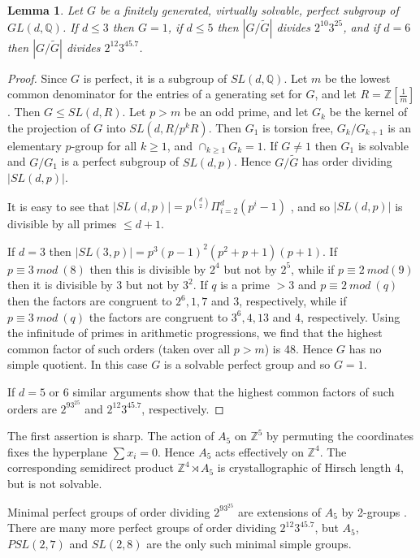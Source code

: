 \documentclass[12pt]{amsart}
\renewcommand{\geq}{\geqslant}
\renewcommand{\leq}{\leqslant}
\newtheorem{lemma}[theorem]{Lemma}
\begin{document}
\begin{lemma}
\label{sl2}
Let $G$ be a finitely generated, virtually solvable,  
perfect subgroup of $GL(d,\mathbb{Q})$. 
If $d\leq3$ then $G=1$,  if $d\leq5$ then $|G/\widetilde{G}|$ divides
$2^{10}3^25$, and if $d=6$ then $|G/\widetilde{G}|$ divides $2^{12}3^45.7$.
\end{lemma}

\begin{proof}
Since $G$ is perfect, it is a subgroup of $SL(d,\mathbb{Q})$.
Let $m$ be the lowest common denominator for 
the entries of a generating set for $G$,
and let $R=\mathbb{Z}[\frac1m]$.
Then $G\leq{SL(d,R)}$.
Let $p>m$ be an odd prime,
and let $G_k$ be the kernel of the projection of $G$ into $SL(d,R/p^kR)$.
Then $G_1$ is torsion free,
$G_k/G_{k+1}$ is an elementary $p$-group for all $k\geq1$,
and $\cap_{k\geq1}G_k=1$.
If $G\not=1$ then $G_1$ is solvable and $G/G_1$ is a perfect subgroup of $SL(d,p)$.
Hence $G/\widetilde{G}$ has order dividing $|SL(d,p)|$.

It is easy to see that $|SL(d,p)|=p^{\binom{d}2}\Pi_{i=2}^d(p^i-1)$
 \cite[3.2.7]{Ro}, 
and so $|SL(d,p)|$ is divisible by all primes $\leq{d+1}$.

If $d=3$ then $|SL(3,p)|=p^3(p-1)^2(p^2+p+1)(p+1)$.
If $p\equiv3~mod~(8)$ then this is divisible by $2^4$ but not by $2^5$,
while if $p\equiv2~mod(9)$ then it is divisible by 3 but not by $3^2$.
If $q$ is a prime $>3$ and $p\equiv2~mod~(q)$ then the factors are congruent 
to $2^6,1,7$ and 3, respectively,  while if $p\equiv3~mod~(q)$ 
the factors are congruent to $3^6,4,13$ and 4, respectively.
Using the infinitude of primes in arithmetic progressions,
we find that the highest common factor of such orders (taken over all $p>m$) is 48.
Hence $G$ has no simple quotient.
In this case $G$ is a solvable perfect group and so $G=1$.

If $d=5$ or 6 similar arguments show that the highest common factors 
of such orders are $2^93^25$ and $2^{12}3^45.7$,
respectively.
\end{proof}

The first assertion is sharp.
The action of $A_5$ on $\mathbb{Z}^5$ by permuting the coordinates fixes
the hyperplane $\sum{x_i}=0$.
Hence $A_5$ acts effectively on $\mathbb{Z}^4$.
The corresponding semidirect product $\mathbb{Z}^4\rtimes{A_5}$ 
is crystallographic of Hirsch length 4,  but is not solvable.

Minimal perfect groups of order dividing $2^93^25$ are extensions of $A_5$ 
by 2-groups \cite{HP}. 
There are many more perfect groups of order dividing $2^{12}3^45.7$,
but $A_5$, $PSL(2,7)$ and $SL(2,8)$ are the only such minimal simple groups.
\end{document}
